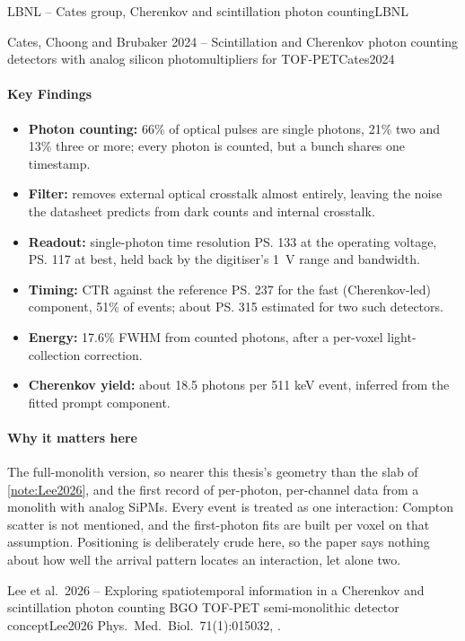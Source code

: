 \begin{programnote}{LBNL -- Cates group, Cherenkov and scintillation photon counting}{LBNL}
\begin{papernote}{Cates, Choong and Brubaker 2024 -- Scintillation and Cherenkov photon counting detectors with analog silicon photomultipliers for TOF-PET}{Cates2024}
\paragraph{Key Findings}
\begin{itemize}
	\item \textbf{Photon counting:} 66\% of optical pulses are single
		photons, 21\% two and 13\% three or more; every photon is counted,
		but a bunch shares one timestamp.
	\item \textbf{Filter:} removes external optical crosstalk almost
		entirely, leaving the noise the datasheet predicts from dark counts
		and internal crosstalk.
	\item \textbf{Readout:} single-photon time resolution \ps{133 }
		at the operating voltage, \ps{117} at best, held back by the
		digitiser's \qty{1}{\volt} range and bandwidth.
	\item \textbf{Timing:} CTR against the reference \ps{237 } for
		the fast (Cherenkov-led) component, 51\% of events; about \ps{315}
		estimated for two such detectors.
	\item \textbf{Energy:} 17.6\% FWHM from counted photons, after a
		per-voxel light-collection correction.
	\item \textbf{Cherenkov yield:} about 18.5 photons per 511 keV event,
		inferred from the fitted prompt component.
\end{itemize}

\paragraph{Why it matters here}
The full-monolith version, so nearer this thesis's geometry than the slab
of \ref{note:Lee2026}, and the first record of per-photon, per-channel data
from a monolith with analog SiPMs. Every event is treated as one
interaction: Compton scatter is not mentioned, and the first-photon fits are
built per voxel on that assumption. Positioning is deliberately crude here,
so the paper says nothing about how well the arrival pattern locates an
interaction, let alone two.

\end{papernote}

\begin{papernote}{Lee et al.\ 2026 -- Exploring spatiotemporal information in a Cherenkov and scintillation photon counting BGO TOF-PET semi-monolithic detector concept}{Lee2026}
Phys.\ Med.\ Biol.\ 71(1):015032, .


\end{papernote}
\end{programnote}
